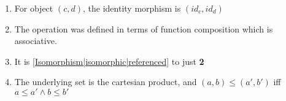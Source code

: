 \begin{enumerate}
    \item For object $(c,d)$, the identity morphism is $(id_c,id_d)$
    \item The operation was defined in terms of function composition which is associative.
    \item It is \ref{Isomorphism|isomorphic|referenced} to just \textbf{2}
    \item The underlying set is the cartesian product, and $(a,b)\leq(a',b')$ iff $a \leq a' \land b \leq b'$
  \end{enumerate}

